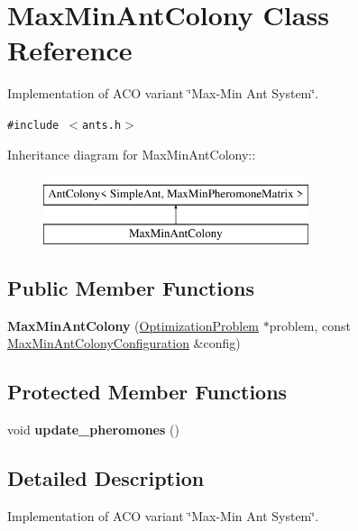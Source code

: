 \hypertarget{classMaxMinAntColony}{
\section{MaxMinAntColony Class Reference}
\label{classMaxMinAntColony}
}
Implementation of ACO variant \char`\"{}Max-Min Ant System\char`\"{}.  


{\tt \#include $<$ants.h$>$}

Inheritance diagram for MaxMinAntColony::\begin{figure}[H]
\begin{center}
\leavevmode
\includegraphics[height=2cm]{classMaxMinAntColony}
\end{center}
\end{figure}
\subsection*{Public Member Functions}
\begin{CompactItemize}
\item 
\hypertarget{classMaxMinAntColony_6ed204255a7375de04e92ddabf610796}{
\textbf{MaxMinAntColony} (\hyperlink{classOptimizationProblem}{OptimizationProblem} $\ast$problem, const \hyperlink{classMaxMinAntColonyConfiguration}{MaxMinAntColonyConfiguration} \&config)}
\label{classMaxMinAntColony_6ed204255a7375de04e92ddabf610796}

\end{CompactItemize}
\subsection*{Protected Member Functions}
\begin{CompactItemize}
\item 
\hypertarget{classMaxMinAntColony_5c1c00b28f589ec8a2fb45f03d068a85}{
void \textbf{update\_\-pheromones} ()}
\label{classMaxMinAntColony_5c1c00b28f589ec8a2fb45f03d068a85}

\end{CompactItemize}


\subsection{Detailed Description}
Implementation of ACO variant \char`\"{}Max-Min Ant System\char`\"{}. 

